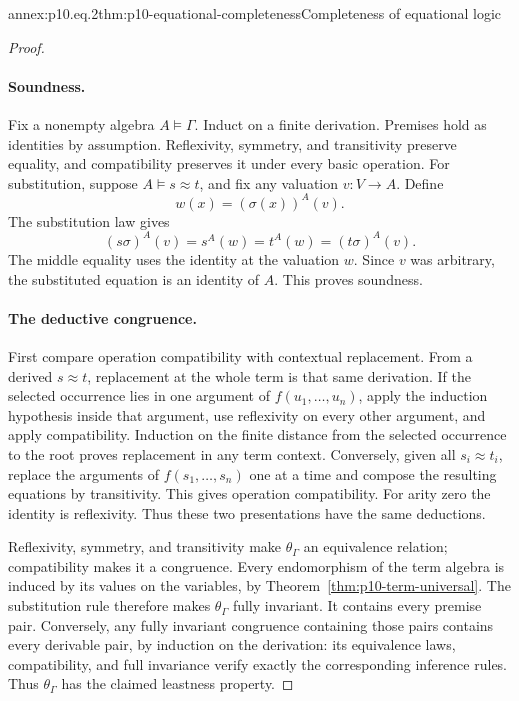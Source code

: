 \begin{annexitem}{annex:p10.eq.2}{thm:p10-equational-completeness}{Completeness of equational logic}
\begin{proof}
\paragraph{Soundness.}
Fix a nonempty algebra \(A\models\Gamma\).
Induct on a finite derivation. Premises hold as identities by
assumption. Reflexivity, symmetry, and transitivity preserve equality,
and compatibility preserves it under every basic operation.
For substitution, suppose \(A\models s\approx t\), and fix
any valuation \(v:V\to A\). Define
\[
 w(x)=(\sigma(x))^A(v).
\]
The substitution law gives
\[
 (s\sigma)^A(v)=s^A(w)=t^A(w)=(t\sigma)^A(v).
\]
The middle equality uses the identity at the valuation \(w\).
Since \(v\) was arbitrary, the substituted equation is an identity
of \(A\). This proves soundness.

\paragraph{The deductive congruence.}
First compare operation compatibility with contextual replacement.
From a derived \(s\approx t\), replacement at the whole term is
that same derivation.
If the selected occurrence lies in one argument of
\(f(u_1,\ldots,u_n)\), apply the induction hypothesis inside that
argument, use reflexivity on every other argument, and apply
compatibility. Induction on the finite distance from the selected
occurrence to the root proves replacement in any term context.
Conversely, given all \(s_i\approx t_i\), replace the arguments of
\(f(s_1,\ldots,s_n)\) one at a time and compose the resulting
equations by transitivity. This gives operation compatibility.
For arity zero the identity is reflexivity.
Thus these two presentations have the same deductions.

Reflexivity, symmetry, and transitivity make \(\theta_\Gamma\)
an equivalence relation; compatibility makes it a congruence.
Every endomorphism of the term algebra is induced by its values on
the variables, by Theorem~\ref{thm:p10-term-universal}.
The substitution rule therefore makes \(\theta_\Gamma\) fully
invariant.
It contains every premise pair.
Conversely, any fully invariant congruence containing those pairs
contains every derivable pair, by induction on the derivation:
its equivalence laws, compatibility, and full invariance verify
exactly the corresponding inference rules.
Thus \(\theta_\Gamma\) has the claimed leastness property.


\end{proof}
\end{annexitem}
